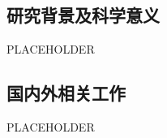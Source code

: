 
\noindent\hspace{\parindent}

\subsection{研究背景及科学意义}

PLACEHOLDER

\subsection{国内外相关工作}

PLACEHOLDER

{


}
